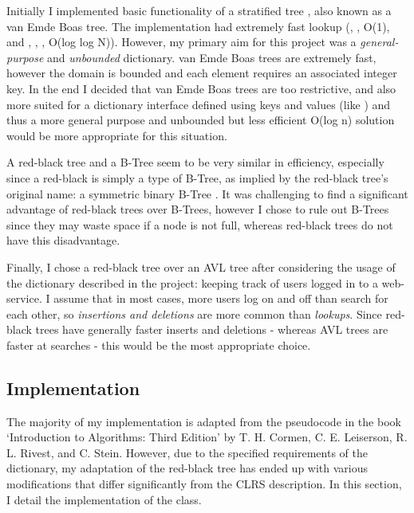 Initially I implemented basic functionality of a stratified tree \cite{stratified}, also known as a van Emde Boas tree. The implementation had extremely fast lookup (, ,  O(1), and , , ,  O(log log N)). However, my primary aim for this project was a \textit{general-purpose} and \textit{unbounded} dictionary. van Emde Boas trees are extremely fast, however the domain is bounded and each element requires an associated integer key. In the end I decided that van Emde Boas trees are too restrictive, and also more suited for a dictionary interface defined using keys and values (like ) and thus a more general purpose and unbounded but less efficient O(log n) solution would be more appropriate for this situation.

A red-black tree and a B-Tree seem to be very similar in efficiency, especially since a red-black is simply a type of B-Tree, as implied by the red-black tree's original name: a symmetric binary B-Tree \cite{bayer}. It was challenging to find a significant advantage of red-black trees over B-Trees, however I chose to rule out B-Trees since they may waste space if a node is not full, whereas red-black trees do not have this disadvantage.

Finally, I chose a red-black tree over an AVL tree after considering the usage of the dictionary described in the project: keeping track of users logged in to a web-service. I assume that in most cases, more users log on and off than search for each other, so \textit{insertions and deletions} are more common than \textit{lookups}. Since red-black trees have generally faster inserts and deletions \cite{clrs} - whereas AVL trees are faster at searches - this would be the most appropriate choice.

\subsection{Implementation}

The majority of my implementation is adapted from the pseudocode in the book `Introduction to Algorithms: Third Edition' by T. H. Cormen, C. E. Leiserson, R. L. Rivest, and C. Stein. However, due to the specified requirements of the dictionary, my adaptation of the red-black tree has ended up with various modifications that differ significantly from the CLRS description. In this section, I detail the implementation of the  class.

